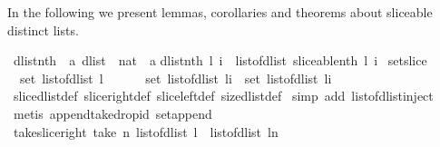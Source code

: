 \begin{isabellebody}
\isamarkupfalse%
%
\endisatagproof
{\isafoldproof}%
%
\isadelimproof
%
\endisadelimproof
\isanewline
\isanewline
{}\isamarkupfalse%
%
\begin{isamarkuptext}%
In the following we present lemmas, corollaries and theorems about sliceable distinct lists.%
\end{isamarkuptext}\isamarkuptrue%
\isamarkupfalse%
\ dlist{\isacharunderscore}nth\ {\isacharcolon}{\isacharcolon}\ {\isachardoublequoteopen}{\isacharprime}a\ dlist\ {\isasymRightarrow}\ nat\ {\isasymRightarrow}\ {\isacharprime}a{\isachardoublequoteclose}\isanewline
{}\isanewline
{\isachardoublequoteopen}dlist{\isacharunderscore}nth\ l\ i\ {\isasymequiv}\ {\isacharparenleft}list{\isacharunderscore}of{\isacharunderscore}dlist\ {\isacharparenleft}sliceable{\isacharunderscore}nth\ l\ i{\isacharparenright}{\isacharparenright}{\isacharbang}{}{\isachardoublequoteclose}\isanewline
\isanewline
{}\isamarkupfalse%
\ set{\isacharunderscore}slice\ {\isacharcolon}\ \isanewline
\ \ {\isachardoublequoteopen}set\ {\isacharparenleft}list{\isacharunderscore}of{\isacharunderscore}dlist\ l{\isacharparenright}\ {\isacharequal}\ \isanewline
\ \ \ \ set\ {\isacharparenleft}list{\isacharunderscore}of{\isacharunderscore}dlist\ {\isacharparenleft}l{\isasymdagger}{\isachardot}{\isachardot}i{\isacharparenright}{\isacharparenright}\ {\isasymunion}\ set\ {\isacharparenleft}list{\isacharunderscore}of{\isacharunderscore}dlist\ {\isacharparenleft}l{\isasymdagger}i{\isachardot}{\isachardot}{\isacharparenright}{\isacharparenright}{\isachardoublequoteclose}\isanewline
%
\isadelimproof
%
\endisadelimproof
%
\isatagproof
{}\isamarkupfalse%
\ slice{\isacharunderscore}dlist{\isacharunderscore}def\ slice{\isacharunderscore}right{\isacharunderscore}def\ slice{\isacharunderscore}left{\isacharunderscore}def\ size{\isacharunderscore}dlist{\isacharunderscore}def\isanewline
{}\isamarkupfalse%
\ {\isacharparenleft}simp\ add{\isacharcolon}\ list{\isacharunderscore}of{\isacharunderscore}dlist{\isacharunderscore}inject{\isacharparenright}\isanewline
{}\isamarkupfalse%
\ {\isacharparenleft}metis\ append{\isacharunderscore}take{\isacharunderscore}drop{\isacharunderscore}id\ set{\isacharunderscore}append{\isacharparenright}%
\endisatagproof
{\isafoldproof}%
%
\isadelimproof
\isanewline
%
\endisadelimproof
\isanewline
{}\isamarkupfalse%
\ take{\isacharunderscore}slice{\isacharunderscore}right{\isacharcolon}\ {\isachardoublequoteopen}take\ n\ {\isacharparenleft}list{\isacharunderscore}of{\isacharunderscore}dlist\ l{\isacharparenright}\ {\isacharequal}\ list{\isacharunderscore}of{\isacharunderscore}dlist\ {\isacharparenleft}l{\isasymdagger}{\isachardot}{\isachardot}n{\isacharparenright}{\isachardoublequoteclose}\isanewline

\end{isabellebody}
